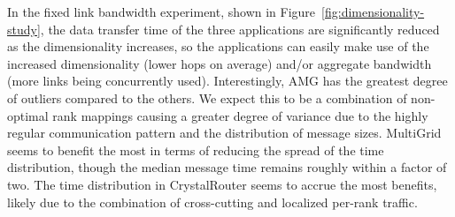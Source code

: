 In the fixed link bandwidth experiment, shown in Figure~\ref{fig:dimensionality-study}, the data transfer time of the three applications are significantly reduced as the dimensionality increases, so the applications can easily make use of the increased dimensionality (lower hops on average) and/or aggregate bandwidth (more links being concurrently used). Interestingly, AMG has the greatest degree of outliers compared to the others. We expect this to be a combination of non-optimal rank mappings causing a greater degree of variance due to the highly regular communication pattern and the distribution of message sizes. MultiGrid seems to benefit the most in terms of reducing the spread of the time distribution, though the median message time remains roughly within a factor of two. The time distribution in CrystalRouter seems to accrue the most benefits, likely due to the combination of cross-cutting and localized per-rank traffic.

